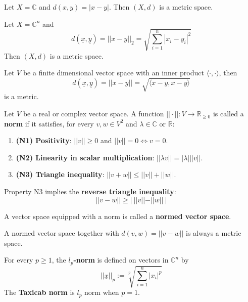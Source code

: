 \begin{example}
	Let $X = \mathbb{C}$ and $d(x, y) = |x - y|$. Then $(X, d)$ is a metric space.
\end{example}

\begin{example}
	Let $X = \mathbb{C}^n$ and
	\[
		d(\underline{x}, \underline{y}) = ||x - y||_2 = \sqrt{\sum_{i = 1}^n |x_i - y_i|^2}
	\]
	Then $(X, d)$ is a metric space.
\end{example}

\begin{example}
	Let $V$ be a finite dimensional vector space with an inner product $\langle \cdot, \cdot \rangle$, then
	\[
		d(\underline{x}, \underline{y}) = ||x - y|| = \sqrt{\langle x - y, x - y \rangle}
	\]
	is a metric.
\end{example}

\begin{definition}
	Let $V$ be a real or complex vector space. A function $||\cdot||: V \rightarrow \mathbb{R}_{\ge 0}$ is called a \textbf{norm} if it satisfies, for every $v, w \in V^2$ and $\lambda \in \mathbb{C}$ or $\mathbb{R}$:
	\begin{enumerate}
		\item \textbf{(N1) Positivity}: $||v|| \ge 0$ and $||v|| = 0 \Longleftrightarrow v = 0$.
		\item \textbf{(N2) Linearity in scalar multiplication}: $||\lambda v|| = |\lambda| ||v||$.
		\item \textbf{(N3) Triangle inequality}: $||v + w|| \le ||v|| + ||w||$.
	\end{enumerate}
\end{definition}

\begin{definition}
	Property N3 implies the \textbf{reverse triangle inequality}:
	\[
		||v - w|| \ge | \ ||v|| - ||w|| \ |
	\]
\end{definition}

\begin{definition}
	A vector space equipped with a norm is called a \textbf{normed vector space}.
\end{definition}

\begin{remark}
	A normed vector space together with $d(v, w) = ||v - w||$ is always a metric space.
\end{remark}

\begin{example}
	For every $p \ge 1$, the \textbf{$l_p$-norm} is defined on vectors in $\mathbb{C}^n$ by
	\[
		||\underline{x}||_p := \sqrt[p]{\sum_{i = 1}^{n} |x_i|^p}
	\]
	The \textbf{Taxicab norm} is $l_p$ norm when $p = 1$.
\end{example}

